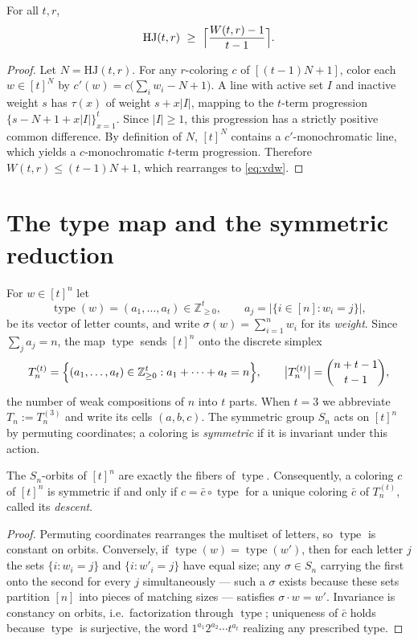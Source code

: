 \documentclass[12pt]{article}
\newcommand{\HJ}{\mathrm{HJ}}
\newcommand{\Wvdw}{W}
\newcommand{\Z}{\mathbb{Z}}
\DeclareMathOperator{\type}{type}
\begin{document}
\begin{proposition}\label{prop:vdw-shadow}
For all $t,r$,
\begin{equation}\label{eq:vdw}
\HJ(t,r)\ \ge\ \Bigl\lceil\frac{\Wvdw(t,r)-1}{t-1}\Bigr\rceil .
\end{equation}
\end{proposition}

\begin{proof}
Let $N=\HJ(t,r)$. For any $r$-coloring $c$ of $[(t-1)N+1]$, color each
$w\in[t]^{N}$ by $c'(w)=c\bigl(\sum_{i}w_{i}-N+1\bigr)$. A line with
active set $I$ and inactive weight $s$ has $\tau(x)$ of weight
$s+x|I|$, mapping to the $t$-term progression
$\{s-N+1+x|I|\}_{x=1}^{t}$. Since $|I|\ge 1$, this progression has a
strictly positive common difference. By definition of $N$, $[t]^{N}$
contains a $c'$-monochromatic line, which yields a $c$-monochromatic
$t$-term progression. Therefore $\Wvdw(t,r)\le(t-1)N+1$, which
rearranges to \eqref{eq:vdw}.
\end{proof}

\section{The type map and the symmetric reduction}\label{sec:reduction}

For $w\in[t]^{n}$ let
\[
\type(w)=(a_{1},\dots,a_{t})\in\Z_{\ge 0}^{t},
\qquad
a_{j}=\bigl|\{i\in[n]:w_{i}=j\}\bigr|,
\]
be its vector of letter counts, and write $\sigma(w)=\sum_{i=1}^{n}w_{i}$
for its \emph{weight}. Since $\sum_{j}a_{j}=n$, the map $\type$ sends
$[t]^{n}$ onto the discrete simplex
\[
T_{n}^{(t)}=\Bigl\{(a_{1},\dots,a_{t})\in\Z_{\ge 0}^{t}:
a_{1}+\dots+a_{t}=n\Bigr\},
\qquad
\bigl|T_{n}^{(t)}\bigr|=\binom{n+t-1}{t-1},
\]
the number of weak compositions of $n$ into $t$ parts. When $t=3$ we
abbreviate $T_{n}:=T_{n}^{(3)}$ and write its cells $(a,b,c)$. The
symmetric group $S_{n}$ acts on $[t]^{n}$ by permuting coordinates; a
coloring is \emph{symmetric} if it is invariant under this action.

\begin{lemma}\label{lem:sym-colorings}
The $S_{n}$-orbits of $[t]^{n}$ are exactly the fibers of $\type$.
Consequently, a coloring $c$ of $[t]^{n}$ is symmetric if and only if
$c=\bar c\circ\type$ for a unique coloring $\bar c$ of $T_{n}^{(t)}$,
called its \emph{descent}.
\end{lemma}

\begin{proof}
Permuting coordinates rearranges the multiset of letters, so $\type$ is
constant on orbits. Conversely, if $\type(w)=\type(w')$, then for each
letter $j$ the sets $\{i:w_{i}=j\}$ and $\{i:w'_{i}=j\}$ have equal
size; any $\sigma\in S_{n}$ carrying the first onto the second for
every $j$ simultaneously --- such a $\sigma$ exists because these sets
partition $[n]$ into pieces of matching sizes --- satisfies
$\sigma\cdot w=w'$. Invariance is constancy on orbits, i.e.\
factorization through $\type$; uniqueness of $\bar c$ holds because
$\type$ is surjective, the word $1^{a_{1}}2^{a_{2}}\cdots t^{a_{t}}$
realizing any prescribed type.
\end{proof}
\end{document}
